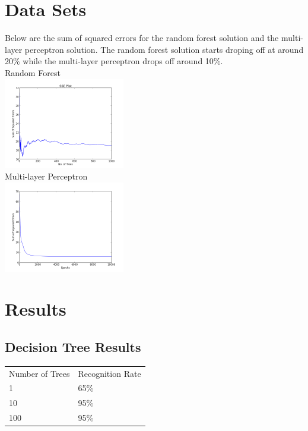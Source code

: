 \documentclass{article}
\begin{document}
\section{Data Sets}



Below are the sum of squared errors for the random forest solution and the multi-layer perceptron
solution. The random forest solution starts droping off at around 20\% while the
multi-layer perceptron drops off around 10\%. \\


{\center Random Forest} \\
\includegraphics[width=200px]{dt_sse_training.png} \\


{\center Multi-layer Perceptron} \\
\includegraphics[width=200px]{mlp_sse_training.png}


\section{Results}


\subsection{Decision Tree Results}
\begin{tabular}{l l}
  Number of Trees &   Recognition Rate\\
  1               &   65\% \\
  10              &   95\% \\
  100             &   95\% \\
\end{tabular}
\end{document}
